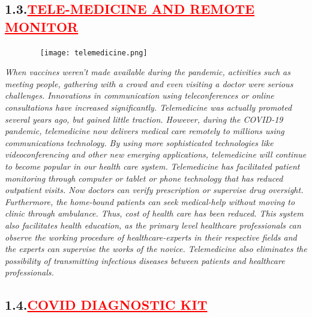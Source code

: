 \documentclass[12pt]{article}
\begin{document}
\subsection*{\textbf{\hspace{1cm}1.3.\hspace{1cm}\textcolor{red}{\underline{\Large{TELE-MEDICINE AND REMOTE MONITOR}}}}}

\begin{figure}
    \centering
    \texttt{[image: telemedicine.png]}
\end{figure}

\hspace{1cm}\large{\emph{When vaccines weren't made available during the pandemic, activities such as meeting people, gathering with a crowd and even visiting a doctor were serious challenges. Innovations in communication using teleconferences or online consultations have increased significantly. Telemedicine was actually promoted several years ago, but gained little traction. However, during the COVID-19 pandemic, telemedicine now delivers medical care remotely to millions using communications technology. By using more sophisticated technologies like videoconferencing and other new emerging applications, telemedicine will continue to become popular in our health care system.}}\vspace{1cm}\newline
\hspace{1cm}\large{\emph{Telemedicine has facilitated patient monitoring through computer or tablet or phone technology that has reduced outpatient visits. Now doctors can verify prescription or supervise drug oversight. Furthermore, the home-bound patients can seek medical-help without moving to clinic through ambulance. Thus, cost of health care has been reduced. This system also facilitates health education, as the primary level healthcare professionals can observe the working procedure of healthcare-experts in their respective fields and the experts can supervise the works of the novice. Telemedicine also eliminates the possibility of transmitting infectious diseases between patients and healthcare professionals.}}\vspace{1cm}

\subsection*{\textbf{\hspace{1cm}1.4.\hspace{1cm}\textcolor{red}{\underline{\Large{COVID DIAGNOSTIC KIT}}}}}
\end{document}
